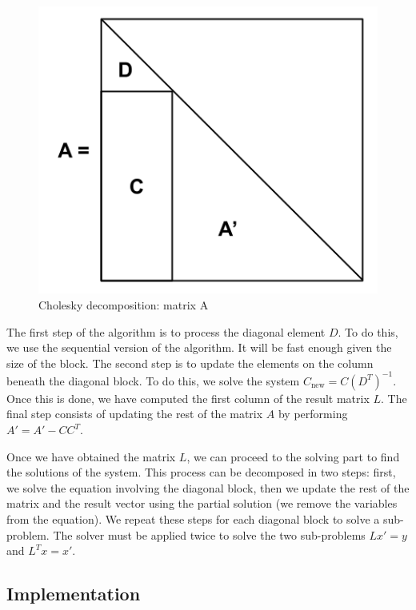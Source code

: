 \begin{figure}[!ht]
  \begin{center}
    \includegraphics[scale=0.4]{img/cho-img/cho_block_dec_A.png}
    \caption{Cholesky decomposition: matrix A}
    \label{fig:chodeca}
  \end{center}
\end{figure}

The first step of the algorithm is to process the diagonal element $D$. To do
this, we use the sequential version of the algorithm. It will be fast enough
given the size of the block. The second step is to update the elements on the
column beneath the diagonal block. To do this, we solve the system
$C_{\text{new}} = C(D^{T})^{-1}$. Once this is done, we have computed the first
column of the result matrix $L$. The final step consists of updating the rest of
the matrix $A$ by performing $A' = A' - CC^{T}$.

Once we have obtained the matrix $L$, we can proceed to the solving part to find
the solutions of the system. This process can be decomposed in two steps: first,
we solve the equation involving the diagonal block, then we update the rest of
the matrix and the result vector using the partial solution (we remove the
variables from the equation). We repeat these steps for each diagonal block to
solve a sub-problem. The solver must be applied twice to solve the two
sub-problems $Lx' = y$ and $L^{T}x = x'$.

\subsection{Implementation}

